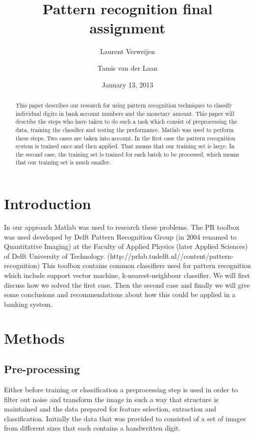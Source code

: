 \documentclass[%
        compressed,
        final,
        notitlepage,
        narroweqnarray,
        inline,
        twoside,
        ]{ieee}
\title{ Pattern recognition final assignment }
\author{Laurent Verweijen \and Tamis van der Laan}
\date{January 13, 2013}
\begin{document}
\maketitle

\begin{abstract}
    This paper describes our research for using pattern recognition techniques
    to classify individual digits in bank account numbers and the monetary
    amount. This paper will describe the steps who have taken to do such a task
    which consist of preprocessing the data, training the classifier and testing
    the performance. Matlab was used to perform these steps. Two cases are taken
    into account. In the first case the pattern recognition system is trained
    once and then applied. That means that our training set is large. In the
    second case, the training set is trained for each batch to be processed,
    which means that our training set is much smaller.
\end{abstract}

\section{Introduction}
In our approach Matlab was used to research these problems. The PR toolbox was
used developed by  Delft Pattern Recognition Group (in 2004 renamed to
Quantitative Imaging) at the Faculty of Applied Physics (later Applied Sciences)
of Delft University of Technology.  (http://prlab.tudelft.nl//content/pattern-recognition)
This toolbox contains common classifiers used for pattern recognition which include support vector machine, k-nearest-neighbour classifier. We will first discuss how we solved the first case. Then the second case and finally we will give some conclusions and recommendations about how this could be applied in a banking system.
\section{Methods}

\subsection{Pre-processing}
Either before training or classification a preprocessing step is used in order to filter out noise and transform the image in such a way that structure is maintained and the data prepared for feature selection, extraction and classification. Initially the data that was provided to consisted of a set of images from different sizes that each contains a handwritten digit.
\end{document}
